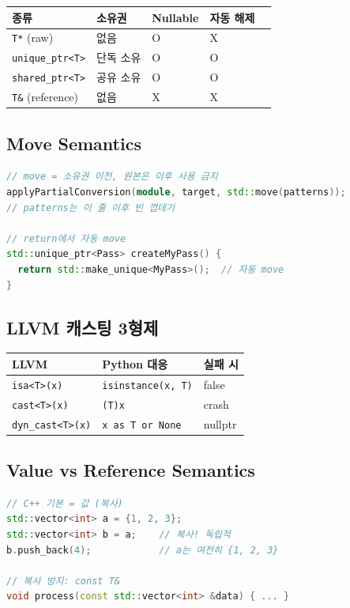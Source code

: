 \documentclass[11pt,a4paper]{article}
\begin{document}
\begin{longtable}{p{3.5cm}p{2.5cm}p{2cm}p{2cm}p{2cm}}
\toprule
종류 & 소유권 & Nullable & 자동 해제 \\
\midrule
\texttt{T*} (raw) & 없음 & O & X \\
\texttt{unique\_ptr<T>} & 단독 소유 & O & O \\
\texttt{shared\_ptr<T>} & 공유 소유 & O & O \\
\texttt{T\&} (reference) & 없음 & X & X \\
\bottomrule
\end{longtable}

\subsection{Move Semantics}

\begin{lstlisting}[language=C++]
// move = 소유권 이전, 원본은 이후 사용 금지
applyPartialConversion(module, target, std::move(patterns));
// patterns는 이 줄 이후 빈 껍데기

// return에서 자동 move
std::unique_ptr<Pass> createMyPass() {
  return std::make_unique<MyPass>();  // 자동 move
}
\end{lstlisting}

\subsection{LLVM 캐스팅 3형제}

\begin{longtable}{p{4cm}p{4cm}p{4cm}}
\toprule
LLVM & Python 대응 & 실패 시 \\
\midrule
\texttt{isa<T>(x)} & \texttt{isinstance(x, T)} & false \\
\texttt{cast<T>(x)} & \texttt{(T)x} & crash \\
\texttt{dyn\_cast<T>(x)} & \texttt{x as T or None} & nullptr \\
\bottomrule
\end{longtable}

\subsection{Value vs Reference Semantics}

\begin{lstlisting}[language=C++]
// C++ 기본 = 값 (복사)
std::vector<int> a = {1, 2, 3};
std::vector<int> b = a;    // 복사! 독립적
b.push_back(4);            // a는 여전히 {1, 2, 3}

// 복사 방지: const T&
void process(const std::vector<int> &data) { ... }
\end{lstlisting}
\end{document}
